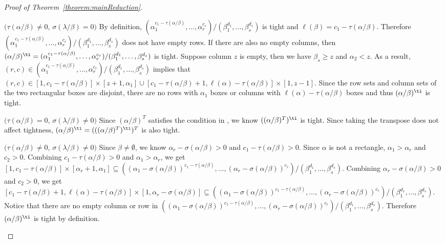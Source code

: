 \begin{proof}[Proof of Theorem~\ref{theorem:mainReduction}]
\begin{Case}
{ $(\tau(\alpha/\beta) \neq 0$, $\sigma(\lambda/\beta) = 0)$} 
By definition, $(\alpha_1^{c_1 - \tau(\alpha / \beta)},\ldots,\alpha_r^{c_r}) / (\beta_1^{d_1},\ldots,\beta_s^{d_s})$ is tight and $\ell(\beta) = c_1-\tau(\alpha/\beta)$. Therefore $(\alpha_1^{c_1 - \tau(\alpha / \beta)},\ldots,\alpha_r^{c_r}) / (\beta_1^{d_1},\ldots,\beta_s^{d_s})$ does not have empty rows. If there are also no empty columns, then $(\alpha/\beta)^{\ti } = (\alpha_1^{c_1 - \tau(\alpha / \beta)},\ldots,\alpha_r^{c_r}) / (\beta_1^{d_1},\ldots,\beta_s^{d_s})$ is tight. Suppose column $z$ is empty, then we have $\beta_s \geq z$ and $\alpha_2<z$. As a result, $(r,c)\in (\alpha_1^{c_1 - \tau(\alpha / \beta)},\ldots,\alpha_r^{c_r}) / (\beta_1^{d_1},\ldots,\beta_s^{d_s})$ implies that $(r,c)\in [1,c_1-\tau(\alpha/\beta)]\times[z+1,\alpha_1]\cup [c_1-\tau(\alpha/\beta)+1,\ell(\alpha)-\tau(\alpha/\beta)]\times[1,z-1]$. Since the row sets and column sets of the two rectangular boxes are disjoint, there are no rows with $\alpha_1$ boxes or columns with $\ell(\alpha)-\tau(\alpha/\beta)$ boxes and thus $(\alpha/\beta)^{\ti }$ is tight.
\end{Case}

\begin{Case}
{ $(\tau(\alpha/\beta) = 0$, $\sigma(\lambda/\beta) \neq 0)$} Since $(\alpha/\beta)^{T}$ satisfies the condition in , we know $((\alpha/\beta)^{T})^{\ti }$ is tight. Since taking the transpose does not affect tightness, $(\alpha/\beta)^{\ti } = (((\alpha/\beta)^{T})^{\ti })^{T}$ is also tight.
\end{Case}

\begin{Case}
{ $(\tau(\alpha/\beta) \neq 0$, $\sigma(\lambda/\beta) \neq 0)$} 
Since $\beta \neq \emptyset$, we know $\alpha_r-\sigma(\alpha/\beta)>0$ and $c_1-\tau(\alpha/\beta)>0$. Since $\alpha$ is not a rectangle, $\alpha_1>\alpha_r$ and $c_2>0$. Combining $c_1-\tau(\alpha/\beta)>0$ and $\alpha_1>\alpha_r$, we get $[1,c_1-\tau(\alpha/\beta)]\times[\alpha_r+1,\alpha_1]\subseteq ((\alpha_1-\sigma(\alpha/\beta))^{c_1 - \tau(\alpha / \beta)},\ldots,(\alpha_r-\sigma(\alpha/\beta))^{c_r}) / (\beta_1^{d_1},\ldots,\beta_s^{d_s})$. Combining $\alpha_r-\sigma(\alpha/\beta)>0$ and $c_2>0$, we get $[c_1-\tau(\alpha/\beta)+1,\ell(\alpha)-\tau(\alpha/\beta)]\times[1,\alpha_r-\sigma(\alpha/\beta)]\subseteq ((\alpha_1-\sigma(\alpha/\beta))^{c_1 - \tau(\alpha / \beta)},\ldots,(\alpha_r-\sigma(\alpha/\beta))^{c_r}) / (\beta_1^{d_1},\ldots,\beta_s^{d_s})$. Notice that there are no empty column or row in $((\alpha_1-\sigma(\alpha/\beta))^{c_1 - \tau(\alpha / \beta)},\ldots,(\alpha_r-\sigma(\alpha/\beta))^{c_r}) / (\beta_1^{d_1},\ldots,\beta_s^{d_s})$. Therefore $(\alpha/\beta)^{\ti }$ is tight by definition.
\end{Case}


\end{proof}
